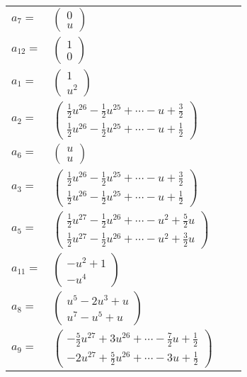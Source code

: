 \documentclass[1p]{elsarticle_modified}
\theoremstyle{definition}
\begin{document}
\begin{tabular}{m{7pt} m{180pt} m{7pt} m{180pt} }
\flushright $a_{7}=$&$\begin{pmatrix}0\\u\end{pmatrix}$ \\
\flushright $a_{12}=$&$\begin{pmatrix}1\\0\end{pmatrix}$ \\
\flushright $a_{1}=$&$\begin{pmatrix}1\\u^2\end{pmatrix}$ \\
\flushright $a_{2}=$&$\begin{pmatrix}\frac{1}{2} u^{26}-\frac{1}{2} u^{25}+\cdots- u+\frac{3}{2}\\\frac{1}{2} u^{26}-\frac{1}{2} u^{25}+\cdots- u+\frac{1}{2}\end{pmatrix}$ \\
\flushright $a_{6}=$&$\begin{pmatrix}u\\u\end{pmatrix}$ \\
\flushright $a_{3}=$&$\begin{pmatrix}\frac{1}{2} u^{26}-\frac{1}{2} u^{25}+\cdots- u+\frac{3}{2}\\\frac{1}{2} u^{26}-\frac{1}{2} u^{25}+\cdots- u+\frac{1}{2}\end{pmatrix}$ \\
\flushright $a_{5}=$&$\begin{pmatrix}\frac{1}{2} u^{27}-\frac{1}{2} u^{26}+\cdots- u^2+\frac{5}{2} u\\\frac{1}{2} u^{27}-\frac{1}{2} u^{26}+\cdots- u^2+\frac{3}{2} u\end{pmatrix}$ \\
\flushright $a_{11}=$&$\begin{pmatrix}- u^2+1\\- u^4\end{pmatrix}$ \\
\flushright $a_{8}=$&$\begin{pmatrix}u^5-2 u^3+u\\u^7- u^5+u\end{pmatrix}$ \\
\flushright $a_{9}=$&$\begin{pmatrix}-\frac{5}{2} u^{27}+3 u^{26}+\cdots-\frac{7}{2} u+\frac{1}{2}\\-2 u^{27}+\frac{5}{2} u^{26}+\cdots-3 u+\frac{1}{2}\end{pmatrix}$ \\

\end{tabular}
\end{document}
